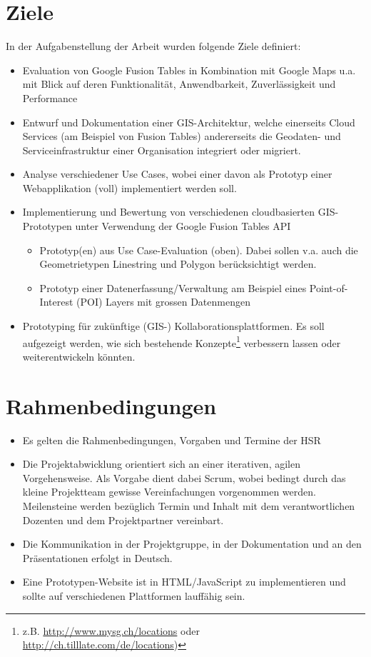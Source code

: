 \section{Ziele}
In der Aufgabenstellung der Arbeit wurden folgende Ziele definiert:
\begin{itemize}
\item Evaluation von Google Fusion Tables in Kombination mit Google Maps u.a. mit Blick auf deren Funktionalität, Anwendbarkeit, Zuverlässigkeit und Performance
\item Entwurf und Dokumentation einer \gls{GIS}-Architektur, welche einerseits \gls{Cloud} Services (am Beispiel von Fusion Tables) andererseits die Geodaten- und Serviceinfrastruktur einer Organisation integriert oder migriert.
\item Analyse verschiedener Use Cases, wobei einer davon als Prototyp einer Webapplikation (voll) implementiert werden soll. 
\item Implementierung und Bewertung von verschiedenen cloudbasierten \gls{GIS}-Prototypen unter Verwendung der Google Fusion Tables \gls{API}
\begin{itemize}
	\item Prototyp(en) aus Use Case-Evaluation (oben). Dabei sollen v.a. auch die Geometrietypen Linestring und Polygon berücksichtigt werden.
	\item Prototyp einer Datenerfassung/Verwaltung am Beispiel eines Point-of-Interest (POI) Layers mit grossen Datenmengen
\end{itemize}
\item Prototyping für zukünftige (\gls{GIS}-) Kollaborationsplattformen. Es soll aufgezeigt werden, wie sich bestehende Konzepte\footnote{z.B. \url{http://www.mysg.ch/locations} oder \url{http://ch.tilllate.com/de/locations})} verbessern lassen oder weiterentwickeln könnten.
\end{itemize}

\section{Rahmenbedingungen}
\begin{itemize}
\item Es gelten die Rahmenbedingungen, Vorgaben und Termine der HSR
\item Die Projektabwicklung orientiert sich an einer iterativen, agilen Vorgehensweise. Als Vorgabe dient dabei Scrum, wobei bedingt durch das kleine Projektteam gewisse Vereinfachungen vorgenommen werden. Meilensteine werden bezüglich Termin und Inhalt mit dem verantwortlichen Dozenten und dem Projektpartner vereinbart.
\item Die Kommunikation in der Projektgruppe, in der Dokumentation und an den Präsentationen erfolgt in Deutsch.
\item Eine Prototypen-Website ist in HTML/JavaScript zu implementieren und sollte auf verschiedenen Plattformen lauffähig sein.
\end{itemize}

